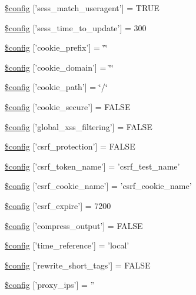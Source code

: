 \begin{DoxyCompactItemize}
\hyperlink{application_2config_2config_8php_a90a66e41bce1a62ff818c4f0e3aa09d2}{\$config} \mbox{[}'sess\-\_\-match\-\_\-useragent'\mbox{]} = T\-R\-U\-E
\item 
\hyperlink{application_2config_2config_8php_afb6a66c470a9c08b90efcbc6c5594573}{\$config} \mbox{[}'sess\-\_\-time\-\_\-to\-\_\-update'\mbox{]} = 300
\item 
\hyperlink{application_2config_2config_8php_ae5f35eb62ffdcfa1878ed13fa47b2d5d}{\$config} \mbox{[}'cookie\-\_\-prefix'\mbox{]} = \char`\"{}\char`\"{}
\item 
\hyperlink{application_2config_2config_8php_a4f967865afe18263372e9c66223a752e}{\$config} \mbox{[}'cookie\-\_\-domain'\mbox{]} = \char`\"{}\char`\"{}
\item 
\hyperlink{application_2config_2config_8php_aeadefdcde429770b04a079e002194d2f}{\$config} \mbox{[}'cookie\-\_\-path'\mbox{]} = \char`\"{}/\char`\"{}
\item 
\hyperlink{application_2config_2config_8php_a7d66abd075b76c2fdcd0837068a13b51}{\$config} \mbox{[}'cookie\-\_\-secure'\mbox{]} = F\-A\-L\-S\-E
\item 
\hyperlink{application_2config_2config_8php_afee3589eecfa5ebecf39f44c271d58ce}{\$config} \mbox{[}'global\-\_\-xss\-\_\-filtering'\mbox{]} = F\-A\-L\-S\-E
\item 
\hyperlink{application_2config_2config_8php_a37f959c7a92cefa11c0df7db2b83c89f}{\$config} \mbox{[}'csrf\-\_\-protection'\mbox{]} = F\-A\-L\-S\-E
\item 
\hyperlink{application_2config_2config_8php_af0e5ccff5383b00a56f4ad3ee0d289d2}{\$config} \mbox{[}'csrf\-\_\-token\-\_\-name'\mbox{]} = 'csrf\-\_\-test\-\_\-name'
\item 
\hyperlink{application_2config_2config_8php_ad8f36090649afb3101c3c337c1d722a1}{\$config} \mbox{[}'csrf\-\_\-cookie\-\_\-name'\mbox{]} = 'csrf\-\_\-cookie\-\_\-name'
\item 
\hyperlink{application_2config_2config_8php_af5c0ea7b77c40439da4f23b7cbb9c2e4}{\$config} \mbox{[}'csrf\-\_\-expire'\mbox{]} = 7200
\item 
\hyperlink{application_2config_2config_8php_a5f03a6c067b921917c2d978f4991bcd1}{\$config} \mbox{[}'compress\-\_\-output'\mbox{]} = F\-A\-L\-S\-E
\item 
\hyperlink{application_2config_2config_8php_acb20698e35bc3d4b9692a4b4619b1b05}{\$config} \mbox{[}'time\-\_\-reference'\mbox{]} = 'local'
\item 
\hyperlink{application_2config_2config_8php_a5d2e2b3f3030d1bd97f6d986ef13ace9}{\$config} \mbox{[}'rewrite\-\_\-short\-\_\-tags'\mbox{]} = F\-A\-L\-S\-E
\item 
\hyperlink{application_2config_2config_8php_a99ce814cf767ce4e281380e6f2158b1b}{\$config} \mbox{[}'proxy\-\_\-ips'\mbox{]} = ''
\end{DoxyCompactItemize}


